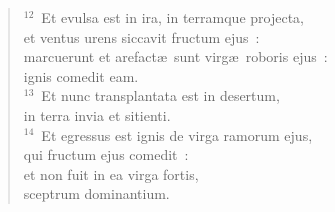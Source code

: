 \begin{flushleft}
\begin{verse}
${}^{12}$~Et evulsa est in ira, in terramque projecta,\\ et ventus urens siccavit fructum ejus~:\\ marcuerunt et arefact\ae\ sunt virg\ae\ roboris ejus~:\\ ignis comedit eam.\\
${}^{13}$~Et nunc transplantata est in desertum,\\ in terra invia et sitienti.\\
${}^{14}$~Et egressus est ignis de virga ramorum ejus,\\ qui fructum ejus comedit~:\\ et non fuit in ea virga fortis,\\ sceptrum dominantium.\end{verse}\end{flushleft}

